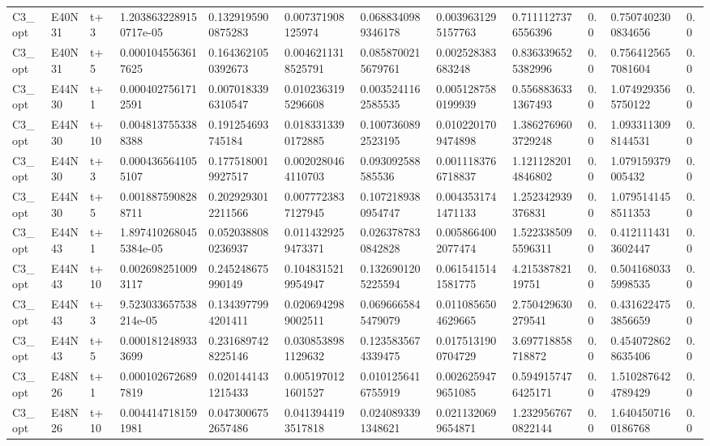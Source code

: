\begin{landscape}
\begin{longtable}{llllllllllll}
C3\_opt & E40N31 & t+3 & 1.2038632289150717e-05 & 0.1329195900875283 & 0.007371908125974 & 0.0688340989346178 & 0.0039631295157763 & 0.7111127376556396 & 0.0 & 0.7507402300834656 & 0.0 \\
C3\_opt & E40N31 & t+5 & 0.0001045563617625 & 0.1643621050392673 & 0.0046211318525791 & 0.0858700215679761 & 0.002528383683248 & 0.8363396525382996 & 0.0 & 0.7564125657081604 & 0.0 \\
C3\_opt & E44N30 & t+1 & 0.0004027561712591 & 0.0070183396310547 & 0.0102363195296608 & 0.0035241162585535 & 0.0051287580199939 & 0.5568836331367493 & 0.0 & 1.0749293565750122 & 0.0 \\
C3\_opt & E44N30 & t+10 & 0.0048137553388388 & 0.191254693745184 & 0.0183313390172885 & 0.1007360892523195 & 0.0102201709474898 & 1.3862769603729248 & 0.0 & 1.0933113098144531 & 0.0 \\
C3\_opt & E44N30 & t+3 & 0.0004365641055107 & 0.1775180019927517 & 0.0020280464110703 & 0.093092588585536 & 0.0011183766718837 & 1.1211282014846802 & 0.0 & 1.079159379005432 & 0.0 \\
C3\_opt & E44N30 & t+5 & 0.0018875908288711 & 0.2029293012211566 & 0.0077723837127945 & 0.1072189380954747 & 0.0043531741471133 & 1.252342939376831 & 0.0 & 1.0795141458511353 & 0.0 \\
C3\_opt & E44N43 & t+1 & 1.8974102680455384e-05 & 0.0520388080236937 & 0.0114329259473371 & 0.0263787830842828 & 0.0058664002077474 & 1.5223385095596311 & 0.0 & 0.4121114313602447 & 0.0 \\
C3\_opt & E44N43 & t+10 & 0.0026982510093117 & 0.245248675990149 & 0.1048315219954947 & 0.1326901205225594 & 0.0615415141581775 & 4.21538782119751 & 0.0 & 0.5041680335998535 & 0.0 \\
C3\_opt & E44N43 & t+3 & 9.523033657538214e-05 & 0.1343977994201411 & 0.0206942989002511 & 0.0696665845479079 & 0.0110856504629665 & 2.750429630279541 & 0.0 & 0.4316224753856659 & 0.0 \\
C3\_opt & E44N43 & t+5 & 0.0001812489333699 & 0.2316897428225146 & 0.0308538981129632 & 0.1235835674339475 & 0.0175131900704729 & 3.697718858718872 & 0.0 & 0.4540728628635406 & 0.0 \\
C3\_opt & E48N26 & t+1 & 0.0001026726897819 & 0.0201441431215433 & 0.0051970121601527 & 0.0101256416755919 & 0.0026259479651085 & 0.5949157476425171 & 0.0 & 1.5102876424789429 & 0.0 \\
C3\_opt & E48N26 & t+10 & 0.0044147181591981 & 0.0473006752657486 & 0.0413944193517818 & 0.0240893391348621 & 0.0211320699654871 & 1.2329567670822144 & 0.0 & 1.6404507160186768 & 0.0 \\

\end{longtable}
\end{landscape}
